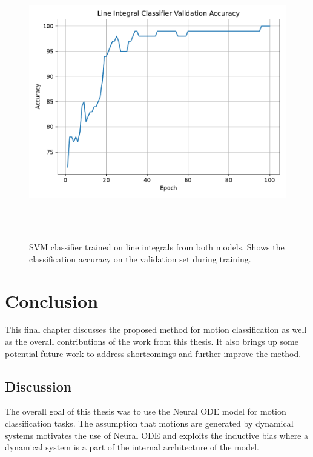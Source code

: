 \documentclass[12pt,a4paper]{book}
\begin{document}
\begin{figure}[H]
    \centering
    \includegraphics[height=12cm]{figs/plots/motion_classification/line_integral_doublemodel_acc.pdf}
    \caption{SVM classifier trained on line integrals from both models. Shows the classification accuracy on the validation set during training.}
    \label{fig:line_integral_doublemodel_acc}
\end{figure}

\chapter{Conclusion}
\label{cha:conclusion}

This final chapter discusses the proposed method for motion classification as well as the overall contributions of the work from this thesis. It also brings up some potential future work to address shortcomings and further improve the method.

\section{Discussion}
\label{sec:Discussion}

The overall goal of this thesis was to use the Neural ODE model for motion classification tasks. The assumption that motions are generated by dynamical systems motivates the use of Neural ODE and exploits the inductive bias where a dynamical system is a part of the internal architecture of the model.
\end{document}
